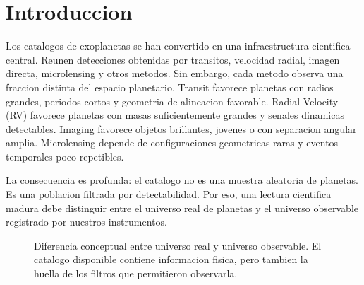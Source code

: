 \documentclass[11pt]{article}
\begin{document}
\section{Introduccion}

Los catalogos de exoplanetas se han convertido en una infraestructura cientifica central. Reunen detecciones obtenidas por transitos, velocidad radial, imagen directa, microlensing y otros metodos. Sin embargo, cada metodo observa una fraccion distinta del espacio planetario. Transit favorece planetas con radios grandes, periodos cortos y geometria de alineacion favorable. Radial Velocity (RV) favorece planetas con masas suficientemente grandes y senales dinamicas detectables. Imaging favorece objetos brillantes, jovenes o con separacion angular amplia. Microlensing depende de configuraciones geometricas raras y eventos temporales poco repetibles.

La consecuencia es profunda: el catalogo no es una muestra aleatoria de planetas. Es una poblacion filtrada por detectabilidad. Por eso, una lectura cientifica madura debe distinguir entre el universo real de planetas y el universo observable registrado por nuestros instrumentos.

\begin{figure}[H]
\centering
{}
\caption{Diferencia conceptual entre universo real y universo observable. El catalogo disponible contiene informacion fisica, pero tambien la huella de los filtros que permitieron observarla.}
\end{figure}
\end{document}
